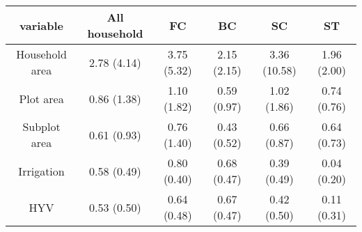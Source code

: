 \begin{table}[ht]
\centering
\begin{tabular}{cccccc}
  \hline
variable & All household & FC & BC & SC & ST \\ 
  \hline
Household area & 2.78 (4.14) & 3.75 (5.32) & 2.15 (2.15) & 3.36 (10.58) & 1.96 (2.00) \\ 
  Plot area & 0.86 (1.38) & 1.10 (1.82) & 0.59 (0.97) & 1.02 (1.86) & 0.74 (0.76) \\ 
  Subplot area & 0.61 (0.93) & 0.76 (1.40) & 0.43 (0.52) & 0.66 (0.87) & 0.64 (0.73) \\ 
  Irrigation & 0.58 (0.49) & 0.80 (0.40) & 0.68 (0.47) & 0.39 (0.49) & 0.04 (0.20) \\ 
  HYV & 0.53 (0.50) & 0.64 (0.48) & 0.67 (0.47) & 0.42 (0.50) & 0.11 (0.31) \\ 
   \hline
\end{tabular}
\end{table}
